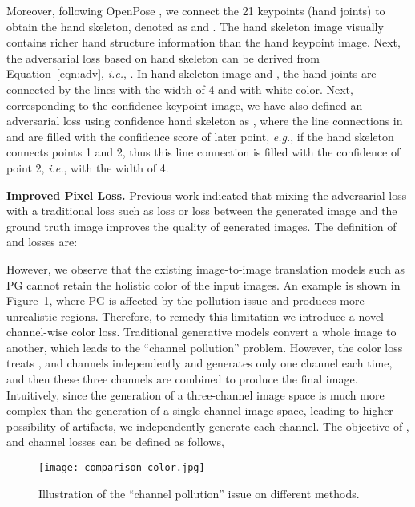 \documentclass[sigconf]{acmart}
\begin{document}
Moreover, following OpenPose \cite{simon2017hand}, we connect the 21 keypoints (hand joints) to obtain the hand skeleton, denoted as  and .
The hand skeleton image visually contains richer hand structure information than the hand keypoint image.
Next, the adversarial loss based on hand skeleton can be derived from Equation~\ref{eqn:adv}, \textit{i.e.}, .
In hand skeleton image  and , the hand joints are connected by the lines with the width of 4 and with white color.
Next, corresponding to the confidence keypoint image, we have also defined an adversarial loss using confidence hand skeleton as ,
where the line connections in  and  are filled with the confidence score of later point, \textit{e.g.}, if the hand skeleton connects points 1 and 2, thus this line connection is filled with the confidence of point 2, \textit{i.e.},  with the width of 4.

\noindent \textbf{Improved Pixel Loss.} Previous work indicated that mixing the adversarial loss with a traditional loss such as  loss \cite{isola2017image} or  loss \cite{pathak2016context} between the generated image and the ground truth image improves the quality of generated images.
The definition of  and  losses are:


However, we observe that the existing image-to-image translation models such as PG \cite{ma2017pose} cannot retain the holistic color of the input images.
An example is shown in Figure~\ref{fig:first_figure}, where PG is affected by the pollution issue and produces more unrealistic regions. 
Therefore, to remedy this limitation we introduce a novel channel-wise color loss.
Traditional generative models convert a whole image to another, which leads to the ``channel pollution'' problem.
However, the color loss treats ,  and  channels independently and generates only one channel each time, and then these three channels are combined to produce the final image.
Intuitively, since the generation of a three-channel image space is much more complex than the generation of a single-channel image space, leading to higher possibility of artifacts, we independently generate each channel.
The objective of ,  and  channel losses can be defined as follows,
\begin{figure}[!t] \tiny
	\centering
	\texttt{[image: comparison\_color.jpg]}
	\caption{Illustration of the ``channel pollution'' issue on different methods.}
	\label{fig:first_figure}
	\vspace{-0.3cm}
\end{figure}
\end{document}
